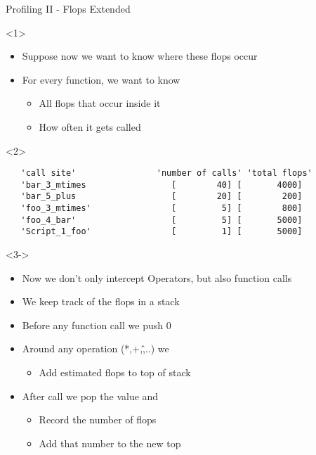 \begin{frame}[fragile]{Profiling II - Flops Extended}
  \begin{onlyenv}<1>
    \begin{itemize}
    \item Suppose now we want to know where these flops occur
    \item For every function, we want to know
      \begin{itemize}
      \item All flops that occur inside it
      \item How often it gets called
      \end{itemize}
    \end{itemize}
  \end{onlyenv}
  \begin{onlyenv}<2>
\begin{Verbatim}
   'call site'                'number of calls' 'total flops'
   'bar_3_mtimes                 [        40] [       4000]
   'bar_5_plus                   [        20] [        200]
   'foo_3_mtimes'                [         5] [        800]
   'foo_4_bar'                   [         5] [       5000]
   'Script_1_foo'                [         1] [       5000]
\end{Verbatim}
  \end{onlyenv}
  \begin{onlyenv}<3->
    \begin{itemize}
    \pause
    \pause \item Now we don't only intercept Operators, but also function calls
    \pause \item We keep track of the flops in a stack
    \pause \item Before any function call we push 0
    \pause \item Around any operation (*,+,\^,..) we
      \begin{itemize}
      \item Add estimated flops to top of stack
      \end{itemize}
    \pause \item After call we pop the value and
      \begin{itemize}
      \item Record the number of flops
      \item Add that number to the new top
      \end{itemize}    
    \end{itemize}
  \end{onlyenv}
\end{frame}

